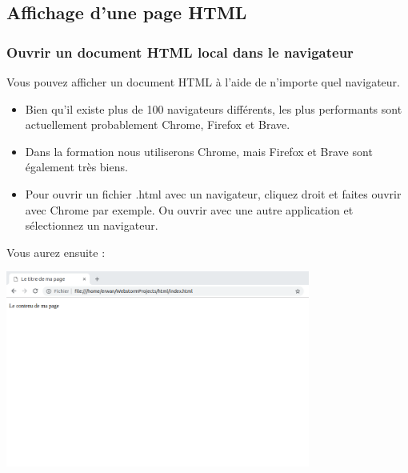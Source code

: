 \documentclass[a4paper]{article}
\begin{document}
\subsection{Affichage d'une page HTML}
\subsubsection{Ouvrir un document {\color{monOrange}HTML} local dans le navigateur}
Vous pouvez afficher un document {\color{monOrange}HTML} à l'aide de n'importe quel navigateur. 
\begin{itemize}
\item Bien qu'il existe plus de 100 navigateurs différents, les plus performants sont actuellement probablement Chrome, Firefox et Brave.

\item Dans la formation nous utiliserons Chrome, mais Firefox et Brave sont également très biens.

\item Pour ouvrir un fichier {\color{monOrange}.html} avec un navigateur, cliquez droit et faites ouvrir avec {\color{monOrange}Chrome} par exemple. Ou ouvrir avec une autre application et sélectionnez un navigateur.
\end{itemize}

Vous aurez ensuite :

\begin{center}
\includegraphics[width=10cm]{images/image02.png}
\end{center}
\end{document}
